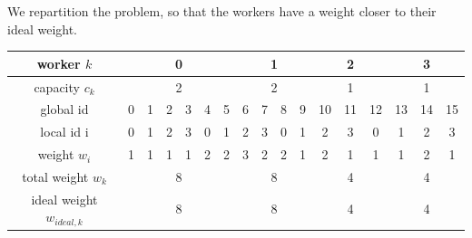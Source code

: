 We repartition the problem, so that the workers have a weight closer to their ideal weight.

\begin{table}[H]
	\begin{center}
		\begin{tabular}{ | c | c | c | c | c | c | c | c | c | c | c | c | c | c | c | c | c | } 
			\hline
			worker $k$ & \multicolumn{6}{c|}{\cellcolor{vs_lightgreen}0} & \multicolumn{4}{c|}{\cellcolor{vs_lightblue}1} & \multicolumn{3}{c|}{\cellcolor{vs_lightred}2} & \multicolumn{3}{c|}{\cellcolor{vs_lightplum}3}  \\
			\hline
			capacity $c_k$ & \multicolumn{6}{c|}{\cellcolor{vs_lightgreen}2} & \multicolumn{4}{c|}{\cellcolor{vs_lightblue}2} & \multicolumn{3}{c|}{\cellcolor{vs_lightred}1} & \multicolumn{3}{c|}{\cellcolor{vs_lightplum}1}  \\
			\hline
			global id & \cellcolor{vs_lightgreen}0 & \cellcolor{vs_lightgreen}1 & \cellcolor{vs_lightgreen}2 & \cellcolor{vs_lightgreen}3 & \cellcolor{vs_lightgreen}4 & \cellcolor{vs_lightgreen}5 & \cellcolor{vs_lightblue}6 & \cellcolor{vs_lightblue}7 & \cellcolor{vs_lightblue}8 & \cellcolor{vs_lightblue}9 & \cellcolor{vs_lightred}10 & \cellcolor{vs_lightred}11 & \cellcolor{vs_lightred}12 & \cellcolor{vs_lightplum}13 & \cellcolor{vs_lightplum}14 & \cellcolor{vs_lightplum}15 \\ 
			\hline
			local id i & \cellcolor{vs_lightgreen}0 & \cellcolor{vs_lightgreen}1 & \cellcolor{vs_lightgreen}2 & \cellcolor{vs_lightgreen}3 & \cellcolor{vs_lightgreen}0 & \cellcolor{vs_lightgreen}1 & \cellcolor{vs_lightblue}2 & \cellcolor{vs_lightblue}3 & \cellcolor{vs_lightblue}0 & \cellcolor{vs_lightblue}1 & \cellcolor{vs_lightred}2 & \cellcolor{vs_lightred}3 & \cellcolor{vs_lightred}0 & \cellcolor{vs_lightplum}1 & \cellcolor{vs_lightplum}2 & \cellcolor{vs_lightplum}3 \\ 
			\hline
			weight $w_i$ & \cellcolor{vs_lightgreen}1 & \cellcolor{vs_lightgreen}1 & \cellcolor{vs_lightgreen}1 & \cellcolor{vs_lightgreen}1 & \cellcolor{vs_lightgreen}2 & \cellcolor{vs_lightgreen}2 & \cellcolor{vs_lightblue}3 & \cellcolor{vs_lightblue}2 & \cellcolor{vs_lightblue}2 & \cellcolor{vs_lightblue}1 & \cellcolor{vs_lightred}2 & \cellcolor{vs_lightred}1 & \cellcolor{vs_lightred}1 & \cellcolor{vs_lightplum}1 & \cellcolor{vs_lightplum}2 & \cellcolor{vs_lightplum}1 \\ 
			\hline
			total weight $w_k$ & \multicolumn{6}{c|}{\cellcolor{vs_lightgreen}8} & \multicolumn{4}{c|}{\cellcolor{vs_lightblue}8} & \multicolumn{3}{c|}{\cellcolor{vs_lightred}4} & \multicolumn{3}{c|}{\cellcolor{vs_lightplum}4} \\ 
			\hline
			ideal weight $w_{ideal,k}$ & \multicolumn{6}{c|}{\cellcolor{vs_lightgreen}8} & \multicolumn{4}{c|}{\cellcolor{vs_lightblue}8} & \multicolumn{3}{c|}{\cellcolor{vs_lightred}4} & \multicolumn{3}{c|}{\cellcolor{vs_lightplum}4} \\ 
			\hline
		\end{tabular}
	

\end{center}
\end{table}
